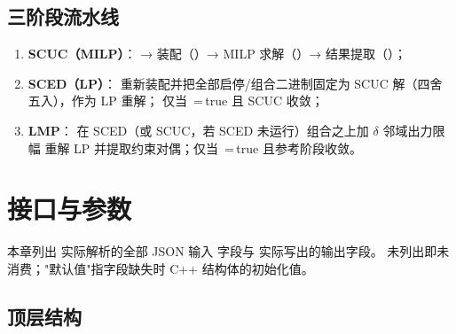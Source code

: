 \documentclass{ctexart}
\begin{document}
\subsection{三阶段流水线}

\begin{enumerate}
  \item \textbf{SCUC（MILP）}：
        → 装配（）→
        MILP 求解（）→
        结果提取（）；
  \item \textbf{SCED（LP）}：
        重新装配并把全部启停/组合二进制固定为 SCUC 解（四舍五入），作为 LP 重解；
        仅当 \,=\,true 且 SCUC 收敛；
  \item \textbf{LMP}：
        在 SCED（或 SCUC，若 SCED 未运行）组合之上加 $\delta$ 邻域出力限幅
        重解 LP 并提取约束对偶；仅当 \,=\,true 且参考阶段收敛。
\end{enumerate}







\section{接口与参数}

本章列出  实际解析的全部 JSON 输入
字段与  实际写出的输出字段。
未列出即未消费；"默认值"指字段缺失时 C++ 结构体的初始化值。

\subsection{顶层结构}
\end{document}
